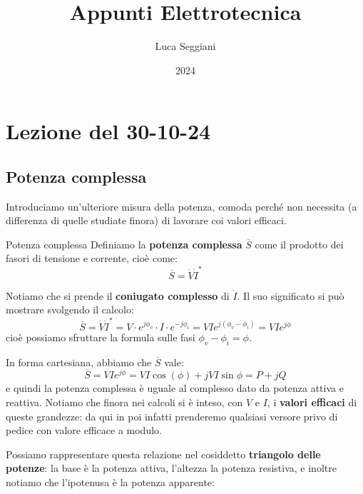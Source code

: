 \documentclass[a4paper,11pt]{article}
\title{Appunti Elettrotecnica}
\author{Luca Seggiani}
\date{2024}
\begin{document}
\section{Lezione del 30-10-24}

\thispagestyle{empty}
\pagestyle{fancy}

\subsection{Potenza complessa}
Introduciamo un'ulteriore misura della potenza, comoda perché non necessita (a differenza di quelle studiate finora) di lavorare coi valori efficaci.
\begin{definition}{Potenza complessa}
Definiamo la \textbf{potenza complessa} $\overline{S}$ come il prodotto dei fasori di tensione e corrente, cioè come:
$$
\overline{S} = \dot{V} \dot{I}^*
$$
\end{definition}

Notiamo che si prende il \textbf{coniugato complesso} di $\dot{I}$.
Il suo significato si può mostrare svolgendo il calcolo:
$$
\overline{S} = \dot{V} \dot{I}^* = V \cdot e^{j \phi_v} \cdot I \cdot e^{-j \phi_i} = VI e^{j(\phi_v - \phi_i)} = VI e^{j\phi}
$$
cioè possiamo sfruttare la formula sulle fasi $\phi_v - \phi_i = \phi$.

In forma cartesiana, abbiamo che $\overline{S}$ vale:
$$
\overline{S} = VI e^{j\phi} = VI \cos(\phi) + j VI \sin{\phi} = P + jQ
$$
e quindi la potenza complessa è uguale al complesso dato da potenza attiva e reattiva.
Notiamo che finora nei calcoli si è inteso, con $V$ e $I$, i \textbf{valori efficaci} di queste grandezze: da qui in poi infatti prenderemo qualsiasi versore privo di pedice con valore efficace a modulo.

Possiamo rappresentare questa relazione nel cosiddetto \textbf{triangolo delle potenze}: la base è la potenza attiva, l'altezza la potenza resistiva, e inoltre notiamo che l'ipotenusa è la potenza apparente:

\begin{center}
\end{center}
\end{document}
